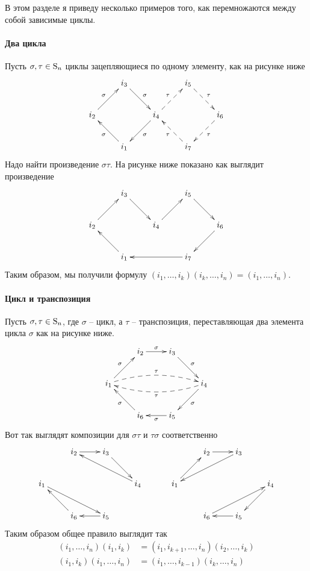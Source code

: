 В этом разделе я приведу несколько примеров того, как перемножаются между собой зависимые циклы.

\paragraph{Два цикла} Пусть $\sigma,\tau\in \operatorname{S}_{n}$ циклы зацепляющиеся по одному элементу, как на рисунке ниже
\[
\xymatrix{
	{}&{i_3}\ar[dr]^{\sigma}&{}&{i_5}\ar@{-->}[dr]^{\tau}&{}\\
	{i_2}\ar[ur]^{\sigma}&{}&{i_4}\ar[dl]^{\sigma}\ar@{-->}[ur]^{\tau}&{}&{i_6}\ar@{-->}[dl]^{\tau}\\
	{}&{i_1}\ar[ul]^{\sigma}&{}&{i_7}\ar@{-->}[ul]^{\tau}&{}\\
}
\]
Надо найти произведение $\sigma\tau$. На рисунке ниже показано как выглядит произведение
\[
\xymatrix{
	{}&{i_3}\ar[dr]&{}&{i_5}\ar[dr]&{}\\
	{i_2}\ar[ur]&{}&{i_4}
	\ar[ur]&{}&{i_6}\ar[dl]\\
	{}&{i_1}\ar[ul]&{}&{i_7}\ar[ll]&{}\\
}
\]
Таким образом, мы получили формулу $(i_1,\ldots,i_k)(i_k,\ldots,i_n) = (i_1,\ldots,i_n)$.

\paragraph{Цикл и транспозиция} Пусть $\sigma,\tau\in\operatorname{S}_{n}$, где $\sigma$ -- цикл, а $\tau$ -- транспозиция, переставляющая два элемента цикла $\sigma$ как на рисунке ниже.
\[
\xymatrix{
	{}&{i_2}\ar[r]^{\sigma}&{i_3}\ar[rd]^{\sigma}&{}\\
	{i_1}\ar[ur]^{\sigma}\ar@{-->}@/^10pt/[rrr]^{\tau}&{}&{}&{i_4}\ar[dl]^{\sigma}\ar@{-->}@/^10pt/[lll]^{\tau}\\
	{}&{i_6}\ar[ul]^{\sigma}&{i_5}\ar[l]^{\sigma}&{}\\
}
\]
Вот так выглядят композиции для $\sigma\tau$ и $\tau\sigma$ соответственно
\[
\xymatrix{
	{}&{i_2}\ar[r]&{i_3}\ar[dr]&{}\\
	{i_1}\ar[drr]&{}&{}&{i_4}\ar[ull]\\
	{}&{i_6}\ar[ul]&{i_5}\ar[l]&{}\\
}
\quad\quad\quad
\xymatrix{
	{}&{i_2}\ar[r]&{i_3}\ar[dll]&{}\\
	{i_1}\ar[ur]&{}&{}&{i_4}\ar[dl]\\
	{}&{i_6}\ar[urr]&{i_5}\ar[l]&{}\\
}
\]
Таким образом общее правило выглядит так 
\begin{align*}
(i_1,\ldots,i_n)(i_1,i_k) &= (i_1,i_{k+1},\ldots,i_n)(i_2,\ldots,i_k)\\
(i_1,i_k)(i_1,\ldots,i_n) &= (i_1,\ldots,i_{k-1})(i_k,\ldots,i_n)
\end{align*}

